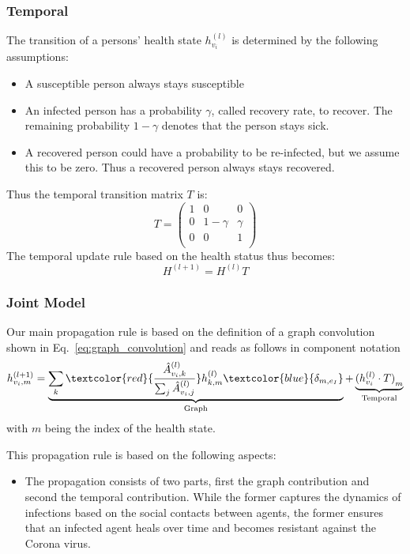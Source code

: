 \subsubsection{Temporal}
The transition of a persons' health state $h_{v_i}^{(l)}$ is determined by the following assumptions:
\begin{itemize}
	\item A susceptible person always stays susceptible
	\item An infected person has a probability $\gamma$, called recovery rate, to recover. The remaining probability $1-\gamma$ denotes that the person stays sick.
	\item A recovered person could have a probability to be re-infected, but we assume this to be zero. Thus a recovered person always stays recovered.
\end{itemize}
Thus the temporal transition matrix $T$ is:
\begin{equation}
T = 
\begin{pmatrix}
1 &     0    & 0      \\
0 & 1-\gamma & \gamma \\
0 &     0    & 1      \\
\end{pmatrix}
\end{equation}
The temporal update rule based on the health status thus becomes:
\begin{equation}
H^{(l+1)} = H^{(l)} T
\end{equation}

\subsubsection{Joint Model}

Our main propagation rule is based on the definition of a graph convolution shown in Eq.~\eqref{eq:graph_convolution} and reads as follows in component notation
\begin{equation}
h_{v_i, m}^{(l+1)}
=
\underbrace{
	\sum_k \textcolor{red}{\frac{\hat{A}_{v_i, k}^{(l)}}{\sum_j \hat{A}_{v_i, j}^{(l)}}} h_{k, m}^{(l)} \textcolor{blue}{\delta_{m, e_I}}
}_{\text{Graph}}
+
\underbrace{
	{(h_{v_i}^{(l)}\cdot T)}_m
}_{\text{Temporal}}
\end{equation}
with $m$ being the index of the health state.

This propagation rule is based on the following aspects:

\begin{itemize}
	\item The propagation consists of two parts, first the graph contribution and second the temporal contribution. While the former captures the dynamics of infections based on the social contacts between agents, the former ensures that an infected agent heals over time and becomes resistant against the Corona virus.
\end{itemize}